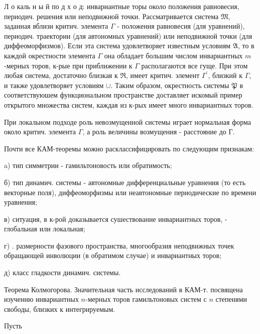 \documentclass[10pt]{article}
\begin{document}
Л о каль н ы й по д х о д: инвариантные торы около положения равновесия, периодич. решения или неподвижной точки. Рассматривается система $\mathfrak{M}$, заданная вблизи критич. элемента $\Gamma$ - положения равновесия (для уравнений), периодич. траектории (для автономных уравнений) или неподвижной точки (для диффеоморфизмов). Если эта система удовлетворяет известным условиям $\mathfrak{A}$, то в каждой окрестности элемента $\Gamma$ она обладает большим числом инвариантных $m$-мерных торов, к-рые при приближении к $\Gamma$ располагаются все гуще. При этом любая система, достаточно близкая к $\mathfrak{R}$, имеет критич. элемент $\Gamma^{\prime}$, близкий к $\Gamma$, и также удовлетворяет условиям $\mathfrak{\cup}$. Таким образом, окрестность системы $\mathfrak{P}$ в соответствуюшем функциональном пространстве доставляет искомый пример открытого множества систем, каждая из к-рых имеет много инвариантных торов.



При локальном подходе роль невозмущенной системы играет нормальная форма около критич. элемента $\Gamma$, а роль величины возмущения - расстояние до Г.



Почти все КАМ-теоремы можно расклассифицировать по следующим признакам:



a) тип симметрии - гамильтоновость или обратимость;



б) тип динамич. системы - автономные дифференциальные уравнения (то есть векторные поля), диффеоморфизмы или неавтономные периодические по времени уравнения;



в) ситуация, в к-рой доказывается сушествование инвариантных торов, - глобальная или локальная;



г) . размерности фазового пространства, многообразия неподвижных точек обращающей инволюции (в обратимом случае) и инвариантных торов;



д) класс гладкости динамич. системы.



Теорема Колмогорова. Значительная часть исследований в КАМ-т. посвящена изучению инвариантных $n$-мерных торов гамильтоновых систем с $n$ степенями свободы, близких к интегрируемым.



Пусть
\end{document}
